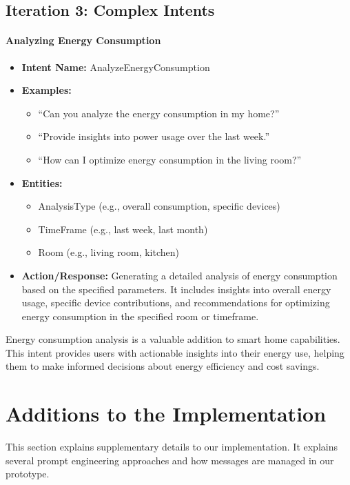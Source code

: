 \subsection{Iteration 3: Complex Intents}

\paragraph{Analyzing Energy Consumption}

\begin{itemize}
    \item \textbf{Intent Name:} AnalyzeEnergyConsumption
    \item \textbf{Examples:}
    \begin{itemize}
        \item ``Can you analyze the energy consumption in my home?''
        \item ``Provide insights into power usage over the last week.''
        \item ``How can I optimize energy consumption in the living room?''
    \end{itemize}
    \item \textbf{Entities:}
    \begin{itemize}
        \item AnalysisType (e.g., overall consumption, specific devices)
        \item TimeFrame (e.g., last week, last month)
        \item Room (e.g., living room, kitchen)
    \end{itemize}
    \item \textbf{Action/Response:} Generating a detailed analysis of energy consumption based on the specified parameters. It includes insights into overall energy usage, specific device contributions, and recommendations for optimizing energy consumption in the specified room or timeframe.
\end{itemize}

Energy consumption analysis is a valuable addition to smart home capabilities. This intent provides users with actionable insights into their energy use, helping them to make informed decisions about energy efficiency and cost savings.


\section{Additions to the Implementation}
This section explains supplementary details to our implementation. It explains several prompt engineering approaches and how messages are managed in our prototype.
